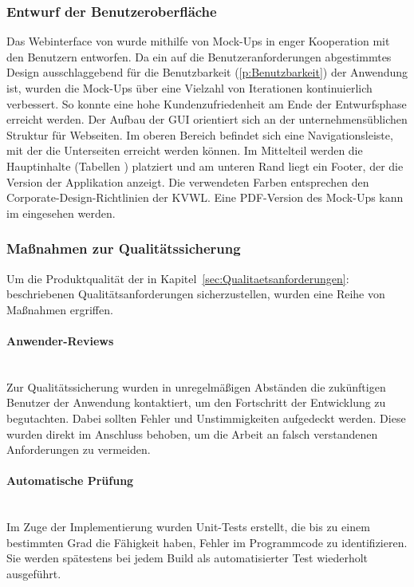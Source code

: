 \subsubsection{Entwurf der Benutzeroberfläche}
\label{sec:Benutzeroberflaeche}
Das Webinterface von \projektName wurde mithilfe von Mock-Ups in enger Kooperation mit den Benutzern entworfen. Da ein auf die Benutzeranforderungen abgestimmtes Design ausschlaggebend für die Benutzbarkeit (\ref{p:Benutzbarkeit}) der Anwendung ist, wurden die Mock-Ups über eine Vielzahl von Iterationen kontinuierlich verbessert. So konnte eine hohe Kundenzufriedenheit am Ende der Entwurfsphase erreicht werden. Der Aufbau der \ac{GUI} orientiert sich an der unternehmensüblichen Struktur für Webseiten. Im oberen Bereich befindet sich eine Navigationsleiste, mit der die Unterseiten erreicht werden können. Im Mittelteil werden die Hauptinhalte (Tabellen \etc) platziert und am unteren Rand liegt ein Footer, der die Version der Applikation anzeigt. Die verwendeten Farben entsprechen den Corporate-Design-Richtlinien der \ac{KVWL}. Eine PDF-Version des Mock-Ups kann im  eingesehen werden.

\subsubsection{Maßnahmen zur Qualitätssicherung}
\label{sec:Qualitaetssicherung}
Um die Produktqualität der in Kapitel~\ref{sec:Qualitaetsanforderungen}:  beschriebenen Qualitätsanforderungen sicherzustellen, wurden eine Reihe von Maßnahmen ergriffen.

\paragraph{Anwender-Reviews} ~\\
\label{p:Reviews}
Zur Qualitätssicherung wurden in unregelmäßigen Abständen die zukünftigen Benutzer der Anwendung kontaktiert, um den Fortschritt der Entwicklung zu begutachten. Dabei sollten Fehler und Unstimmigkeiten aufgedeckt werden. Diese wurden direkt im Anschluss behoben, um \zB die Arbeit an falsch verstandenen Anforderungen zu vermeiden.

\paragraph{Automatische Prüfung} ~\\
\label{p:Pruefung}
Im Zuge der Implementierung wurden Unit-Tests erstellt, die bis zu einem bestimmten Grad die Fähigkeit haben, Fehler im Programmcode zu identifizieren. Sie werden spätestens bei jedem Build als automatisierter Test wiederholt ausgeführt.

